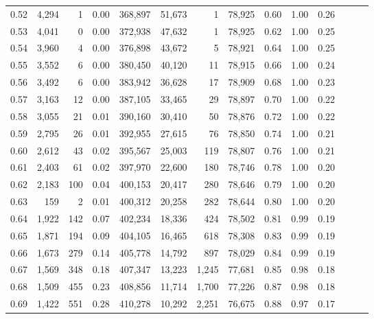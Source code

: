 \begin{tabular}{rrrrrrrrrrrrrr}
0.52 &   4,294 &      1 &  0.00 &  368,897 &   51,673 &       1 &  78,925 &  0.60 &  1.00 &      0.26 \\
0.53 &   4,041 &      0 &  0.00 &  372,938 &   47,632 &       1 &  78,925 &  0.62 &  1.00 &      0.25 \\
0.54 &   3,960 &      4 &  0.00 &  376,898 &   43,672 &       5 &  78,921 &  0.64 &  1.00 &      0.25 \\
0.55 &   3,552 &      6 &  0.00 &  380,450 &   40,120 &      11 &  78,915 &  0.66 &  1.00 &      0.24 \\
0.56 &   3,492 &      6 &  0.00 &  383,942 &   36,628 &      17 &  78,909 &  0.68 &  1.00 &      0.23 \\
0.57 &   3,163 &     12 &  0.00 &  387,105 &   33,465 &      29 &  78,897 &  0.70 &  1.00 &      0.22 \\
0.58 &   3,055 &     21 &  0.01 &  390,160 &   30,410 &      50 &  78,876 &  0.72 &  1.00 &      0.22 \\
0.59 &   2,795 &     26 &  0.01 &  392,955 &   27,615 &      76 &  78,850 &  0.74 &  1.00 &      0.21 \\
0.60 &   2,612 &     43 &  0.02 &  395,567 &   25,003 &     119 &  78,807 &  0.76 &  1.00 &      0.21 \\
0.61 &   2,403 &     61 &  0.02 &  397,970 &   22,600 &     180 &  78,746 &  0.78 &  1.00 &      0.20 \\
0.62 &   2,183 &    100 &  0.04 &  400,153 &   20,417 &     280 &  78,646 &  0.79 &  1.00 &      0.20 \\
0.63 &     159 &      2 &  0.01 &  400,312 &   20,258 &     282 &  78,644 &  0.80 &  1.00 &      0.20 \\
0.64 &   1,922 &    142 &  0.07 &  402,234 &   18,336 &     424 &  78,502 &  0.81 &  0.99 &      0.19 \\
0.65 &   1,871 &    194 &  0.09 &  404,105 &   16,465 &     618 &  78,308 &  0.83 &  0.99 &      0.19 \\
0.66 &   1,673 &    279 &  0.14 &  405,778 &   14,792 &     897 &  78,029 &  0.84 &  0.99 &      0.19 \\
0.67 &   1,569 &    348 &  0.18 &  407,347 &   13,223 &   1,245 &  77,681 &  0.85 &  0.98 &      0.18 \\
0.68 &   1,509 &    455 &  0.23 &  408,856 &   11,714 &   1,700 &  77,226 &  0.87 &  0.98 &      0.18 \\
0.69 &   1,422 &    551 &  0.28 &  410,278 &   10,292 &   2,251 &  76,675 &  0.88 &  0.97 &      0.17 \\

\end{tabular}
